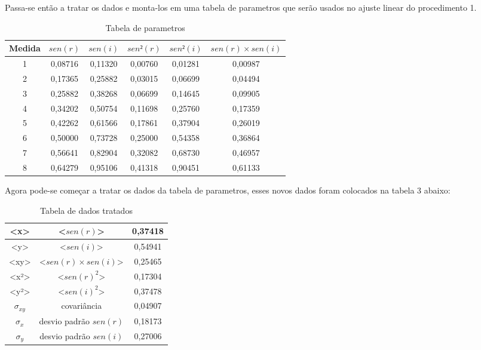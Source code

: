 \documentclass [a4paper, 12pt]{article}
\begin{document}
Passa-se então a tratar os dados e monta-los em uma tabela de parametros que serão usados no ajuste linear do procedimento 1.

\begin{table}[h]
\centering
\caption{Tabela de parametros}
\vspace{0.5cm}
\begin{tabular}{|c|c|c|c|c|c|} \hline
Medida & $sen(r)$ & $sen(i)$ & $sen²(r)$ & $sen²(i)$ & $sen(r)\times sen(i)$ \\ %
\hline                               %
1  &  0,08716  &  0,11320  &  0,00760  &  0,01281  &  0,00987   \\  \hline
2  &  0,17365  &  0,25882  &  0,03015  &  0,06699  &  0,04494   \\  \hline
3  &  0,25882  &  0,38268  &  0,06699  &  0,14645  &  0,09905   \\  \hline
4  &  0,34202  &  0,50754  &  0,11698  &  0,25760  &  0,17359   \\  \hline
5  &  0,42262  &  0,61566  &  0,17861  &  0,37904  &  0,26019   \\  \hline
6  &  0,50000  &  0,73728  &  0,25000  &  0,54358  &  0,36864   \\  \hline
7  &  0,56641  &  0,82904  &  0,32082  &  0,68730  &  0,46957   \\  \hline
8  &  0,64279  &  0,95106  &  0,41318  &  0,90451  &  0,61133   \\  \hline
\end{tabular}
\end{table}

Agora pode-se começar a tratar os dados da tabela de parametros, esses novos dados foram colocados na tabela 3 abaixo:

\newpage
\begin{table}[h!]
\centering
\caption{Tabela de dados tratados}
\vspace{0.5cm}
\begin{tabular}{|c|c|c|} \hline

<x>            &   <$sen(r)$>                   &  0,37418    \\ \hline
<y>            &   <$sen(i)$>                   &  0,54941    \\ \hline
<xy>           &   <$sen(r) \times sen(i)$>     &  0,25465    \\ \hline
<x²>           &   <$sen(r)^2$>                 &  0,17304    \\ \hline
<y²>           &   <$sen(i)^2$>                 &  0,37478    \\ \hline
$\sigma_{xy}$  &    covariância                 &  0,04907    \\ \hline
$\sigma_{x}$   &    desvio padrão $sen(r)$      &  0,18173    \\ \hline
$\sigma_{y}$   &    desvio padrão $sen(i)$      &  0,27006    \\ \hline
 
\end{tabular}
\end{table}
\end{document}
